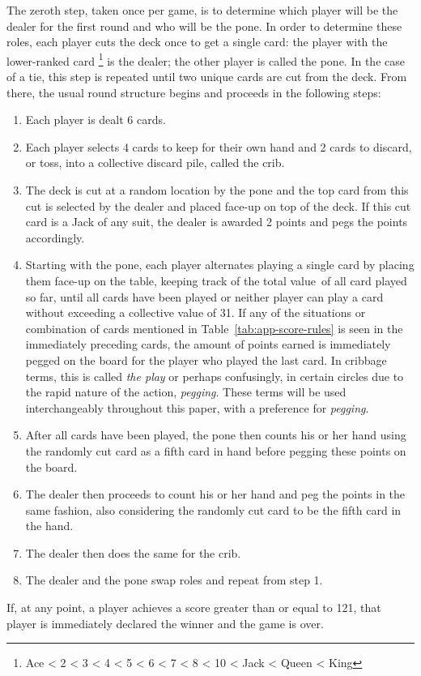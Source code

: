 The zeroth step, taken once per game, is to determine which player will be the
dealer for the first round and who will be the pone.
%
In order to determine these roles,
each player cuts the deck once to get a single card:
the player with the lower-ranked card%
\footnote{Ace < 2 < 3 < 4 < 5 < 6 < 7 < 8 < 10 < Jack < Queen < King}
is the dealer;
the other player is called the pone.
In the case of a tie, this step is repeated until two unique cards are
cut from the deck.
%
From there, the usual round structure begins and proceeds in the following
steps:
%
\begin{enumerate} %
%
\item Each player is dealt 6 cards.
%
\item Each player selects 4 cards to keep for their own hand and 2 cards to
	discard, or toss, into a collective discard pile, called the crib.
%
\item The deck is cut at a random location by the pone
	and the top card from this cut is selected by the dealer and placed
	face-up on top of the deck.
	If this cut card is a Jack of any suit,
	the dealer is awarded 2 points and pegs the points accordingly.
%
\item Starting with the pone, each player alternates playing a single card
	by placing them face-up on the table,
	keeping track of the total value\footnotemark\ of all card played so far,
	until all cards have been played
	or neither player can play a card without exceeding a collective value of
	31.
	If any of the situations or combination of cards mentioned in
	Table~\ref{tab:app-score-rules} is seen in the immediately preceding cards,
	the amount of points earned is immediately pegged on the board for the
	player who played the last card.
	In cribbage terms, this is called \textit{the play}
	or perhaps confusingly,
	in certain circles due to the rapid nature of the
	action, \textit{pegging}.
	These terms will be used interchangeably throughout this paper,
	with a preference for \textit{pegging}.
%
\item After all cards have been played,
	the pone then counts his or her hand using the randomly cut card as a
	fifth card in hand before pegging these points on the board.
%
\item The dealer then proceeds to count his or her hand and peg the points
	in the same fashion, also considering the randomly cut card to be the
	fifth card in the hand.
%
\item The dealer then does the same for the crib.
%
\item The dealer and the pone swap roles and repeat from step 1.
%
\end{enumerate}
%
If, at any point, a player achieves a score greater than or equal to 121,
that player is immediately declared the winner and the game is over.


